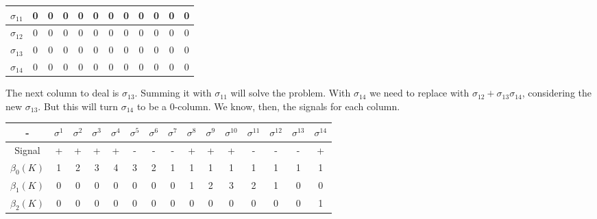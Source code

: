 \begin{enumerate}
\begin{center}
\begin{tabular}{|c|c|c|c|c|c|c|c|c|c|c|c|}
            $\sigma_{11}$ & 0                  & 0          & 0          & 0          & 0          & 0          & 0             & 0             & 0             & 0             & 0             \\ \hline
            $\sigma_{12}$ & 0                  & 0          & 0          & 0          & 0          & 0          & 0             & 0             & 0             & 0             & 0             \\ \hline
            $\sigma_{13}$ & 0                  & 0          & 0          & 0          & 0          & 0          & 0             & 0             & 0             & 0             & 0             \\ \hline
            $\sigma_{14}$ & 0                  & 0          & 0          & 0          & 0          & 0          & 0             & 0             & 0             & 0             & 0             \\ \hline
        \end{tabular}
    \end{center}

    The next column to deal is $\sigma_{13}$. Summing it with $\sigma_{11}$
    will solve the problem. With $\sigma_{14}$ we need to replace with
    $\sigma_{12} + \sigma_{13} \sigma_{14}$, considering the new
    $\sigma_{13}$. But this will turn $\sigma_{14}$ to be a 0-column. We know,
    then, the signals for each column. 

    \begin{center}
        \begin{tabular}{ c|c|c|c|c|c|c|c|c|c|c|c|c|c|c}
         - & $\sigma^1$ & $\sigma^2$ & $\sigma^3$ & $\sigma^4$ & $\sigma^5$ &
         $\sigma^6$ & $\sigma^7$ &$\sigma^8$ &$\sigma^9$ &$\sigma^{10}$
         &$\sigma^{11}$ &$\sigma^{12}$ &$\sigma^{13}$ &$\sigma^{14}$ \\ 
         \hline
         Signal & + & + & + & + & - & - & - & + & + & + & - & - & - & + \\  
         $\beta_0(K)$ & 1 & 2 & 3 & 4 & 3 & 2 & 1 & 1 & 1 & 1 & 1 & 1 & 1 & 1\\ 
         $\beta_1(K)$ & 0 & 0 & 0 & 0 & 0 & 0 & 0 & 1 & 2 & 3 & 2 & 1 & 0 & 0 \\     
         $\beta_2(K)$ & 0 & 0 & 0 & 0 & 0 & 0 & 0 & 0 & 0 & 0 & 0 & 0 & 0 & 1\\     

        \end{tabular}
    \end{center}

\end{enumerate}
